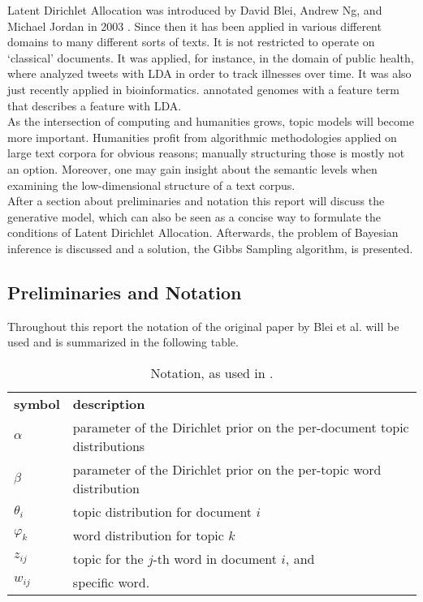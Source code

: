 \documentclass[a4paper,ngerman, english]{atseminar}
\begin{document}
Latent Dirichlet Allocation was introduced by David Blei, Andrew Ng, and Michael Jordan in 2003 \cite{blei2003latent}.
Since then it has been applied in various different domains to many different sorts of texts. 
It is not restricted to operate on `classical' documents. It was applied, for instance, in the domain of public health, where
\cite{paul2011you} analyzed tweets with LDA in order to track illnesses over time. It was also 
just recently applied in bioinformatics. \cite{pinoli2014latent} annotated genomes with a feature term 
that describes a feature with LDA.
\\
As the intersection of computing and humanities grows, topic models will become more important.
Humanities profit from algorithmic methodologies applied on large text corpora for obvious reasons;
manually structuring those is mostly not an option. Moreover, one may gain insight about the semantic levels when
examining the low-dimensional structure of a text corpus.\\
After a section about preliminaries and notation this report will discuss the generative model, 
which can also be seen as a concise way to formulate the conditions of Latent Dirichlet Allocation.
Afterwards, the problem of Bayesian inference is discussed and a solution, the Gibbs Sampling algorithm, is presented.


\subsection{Preliminaries and Notation}

Throughout this report the notation of the original paper by Blei et al. will be used and 
is summarized in the following table.

\begin{table}[h]
\centering
\caption{Notation, as used in \cite{blei2003latent}.}
\begin{tabular}{l l}
\textbf{symbol} & \textbf{description} \\
 $\alpha$       & parameter of the Dirichlet prior on the per-document topic distributions \\
 $\beta$        & parameter of the Dirichlet prior on the per-topic word distribution \\ 
 $\theta_i$      & topic distribution for document $i$ \\
 $\varphi_k$   & word distribution for topic $k$ \\
 $z_{ij}$         & topic for the $j$-th word in document $i$, and \\
 $w_{ij}$        & specific word.
  
\end{tabular}
\label{XY:tab:interesting}
\end{table}
\end{document}
